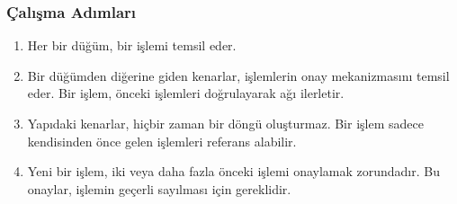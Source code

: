 \subsubsection{Çalışma Adımları}

\begin{enumerate}
    \item Her bir düğüm, bir işlemi temsil eder.
    \item Bir düğümden diğerine giden kenarlar, işlemlerin onay mekanizmasını temsil eder. Bir işlem, önceki işlemleri doğrulayarak ağı ilerletir.
    \item Yapıdaki kenarlar, hiçbir zaman bir döngü oluşturmaz. Bir işlem sadece kendisinden önce gelen işlemleri referans alabilir.
    \item Yeni bir işlem,  iki veya daha fazla önceki işlemi onaylamak zorundadır. Bu onaylar, işlemin geçerli sayılması için gereklidir.
\end{enumerate}

\newpage